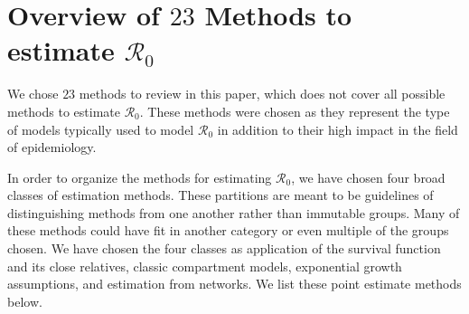 \documentclass[12pt]{article}
\newcommand{\XX}{\ensuremath{23}} %
\newcommand{\rr}{\ensuremath{\mathcal{R}_0}}
\begin{document}
\section{Overview of $\XX$ Methods to estimate $\rr$}
\label{sec:overview}

We chose $\XX$ methods to review in this paper, which does not cover all possible methods to estimate $\rr$.  These methods were chosen as  they represent the type of models typically used to model $\rr$ in addition to their high impact in the field of epidemiology.

In order to organize the methods for estimating \rr, we have chosen four broad classes of estimation methods.  These partitions are meant to be guidelines of distinguishing methods from one another rather than immutable groups.  Many of these methods could have fit in another category or even multiple of the groups chosen.  We have chosen the four classes as application of the survival function and its close relatives, classic compartment models, exponential growth assumptions, and estimation from networks.  We list these point estimate methods below.
\end{document}
